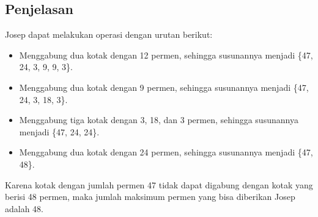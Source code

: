 \documentclass{article}
\begin{document}
\subsection*{Penjelasan}
Josep dapat melakukan operasi dengan urutan berikut:
\begin{itemize}
    \item Menggabung dua kotak dengan 12 permen, sehingga susunannya menjadi \{47, 24, 3, 9, 9, 3\}.
    \item Menggabung dua kotak dengan 9 permen, sehingga susunannya menjadi \{47, 24, 3, 18, 3\}.
    \item Menggabung tiga kotak dengan 3, 18, dan 3 permen, sehingga susunannya menjadi \{47, 24, 24\}.
    \item Menggabung dua kotak dengan 24 permen, sehingga susunannya menjadi \{47, 48\}.
\end{itemize}
Karena kotak dengan jumlah permen 47 tidak dapat digabung dengan kotak yang berisi 48 permen, maka jumlah maksimum permen yang bisa diberikan Josep adalah 48.
\end{document}
